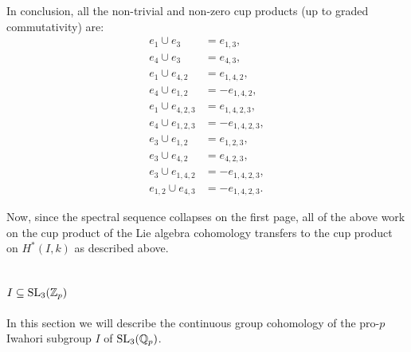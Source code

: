 In conclusion, all the non-trivial and non-zero cup products (up to graded commutativity) are:
\begin{equation}
  \label{eq:cup-products-GL2}
  \begin{aligned}
    e_{1} \cup e_{3} &= e_{1,3}, \\
    e_{4} \cup e_{3} &= e_{4,3}, \\
    e_{1} \cup e_{4,2} &= e_{1,4,2}, \\
    e_{4} \cup e_{1,2} &= -e_{1,4,2}, \\
    e_{1} \cup e_{4,2,3} &= e_{1,4,2,3}, \\
    e_{4} \cup e_{1,2,3} &= -e_{1,4,2,3}, \\
    e_{3} \cup e_{1,2} &= e_{1,2,3}, \\
    e_{3} \cup e_{4,2} &= e_{4,2,3}, \\
    e_{3} \cup e_{1,4,2} &= -e_{1,4,2,3}, \\
    e_{1,2} \cup e_{4,3} &= -e_{1,4,2,3}.
  \end{aligned}
\end{equation}

Now, since the spectral sequence collapses on the first page, all of the above work on the cup product of the Lie algebra cohomology transfers to the cup product on $H^{*}(I,k)$ as described above.

\section{\texorpdfstring{$I \subseteq \operatorname{SL}_{3}(\mathbb{Z}_{p})$}{I in SL3(Zp)}}%
\label{sec:Iwa-SL3}

In this section we will describe the continuous group cohomology of the pro-$p$ Iwahori subgroup $I$ of $\operatorname{SL}_{3}(\mathbb{Q}_{p})$.

